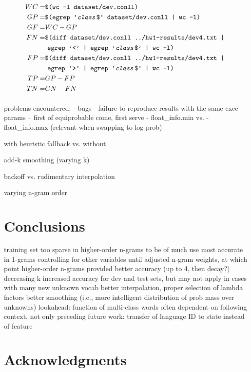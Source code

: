 \documentclass[11pt,a4paper]{article}
\begin{document}
{\tiny
\begin{align*}{}
  WC =& \texttt{\$(wc -l dataset/dev.conll)} \\
  GP =& \texttt{\$(egrep '\emph{class}\$' dataset/dev.conll | wc -l)} \\
  GF =& WC - GP \\
  FN =& \texttt{\$(diff dataset/dev.conll ../hw1-results/dev4.txt | } \\
     &\  \texttt{egrep '<' | egrep '\emph{class}\$' | wc -l)} \\
  FP =& \texttt{\$(diff dataset/dev.conll ../hw1-results/dev4.txt | } \\
     &\  \texttt{egrep '>' | egrep '\emph{class}\$' | wc -l)} \\
  TP =& GP - FP \\
  TN =& GN - FN
\end{align*}}

\paragraph{}
problems encountered:
- bugs
- failure to reproduce results with the same exec params
-- first of equiprobable come, first serve
- float\_info.min vs. -float\_info.max (relevant when swapping to log prob)

with heuristic fallback vs. without

add-k smoothing (varying k)

backoff vs. rudimentary interpolation

varying n-gram order

\section{Conclusions}

training set too sparse in higher-order n-grams to be of much use
most accurate in 1-grams controlling for other variables until adjusted n-gram weights, at which point higher-order n-grams provided better accuracy (up to 4, then decay?)
decreasing k increased accuracy for dev and test sets, but may not apply in cases with many new unknown vocab
better interpolation, proper selection of lambda factors
better smoothing (i.e., more intelligent distribution of prob mass over unknowns)
lookahead: function of multi-class words often dependent on following context, not only preceding
future work: transfer of language ID to state instead of feature

\section*{Acknowledgments}
\end{document}
